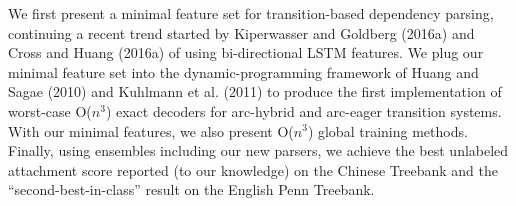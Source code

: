 We first present a minimal feature set for transition-based dependency parsing, continuing a recent trend started by Kiperwasser and Goldberg (2016a) and Cross and Huang (2016a) of using bi-directional LSTM features. We plug our minimal feature set into the dynamic-programming framework of Huang and Sagae (2010) and Kuhlmann et al. (2011) to produce the first implementation of worst-case O($n^3$) exact decoders for arc-hybrid and arc-eager transition systems. With our minimal features, we also present O($n^3$) global training methods. Finally, using ensembles including our new parsers, we achieve the best unlabeled attachment score reported (to our knowledge) on the Chinese Treebank and the ``second-best-in-class'' result on the English Penn Treebank.
